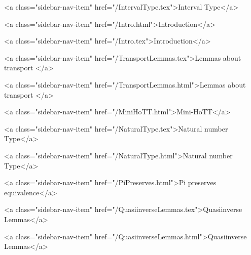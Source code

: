       
        
          <a class="sidebar-nav-item" href="/IntervalType.tex">Interval Type</a>
        
      
    
      
        
          <a class="sidebar-nav-item" href="/Intro.html">Introduction</a>
        
      
    
      
        
          <a class="sidebar-nav-item" href="/Intro.tex">Introduction</a>
        
      
    
      
        
          <a class="sidebar-nav-item" href="/TransportLemmas.tex">Lemmas about transport </a>
        
      
    
      
        
          <a class="sidebar-nav-item" href="/TransportLemmas.html">Lemmas about transport </a>
        
      
    
      
        
          <a class="sidebar-nav-item" href="/MiniHoTT.html">Mini-HoTT</a>
        
      
    
      
        
          <a class="sidebar-nav-item" href="/NaturalType.tex">Natural number Type</a>
        
      
    
      
        
          <a class="sidebar-nav-item" href="/NaturalType.html">Natural number Type</a>
        
      
    
      
        
          <a class="sidebar-nav-item" href="/PiPreserves.html">Pi preserves equivalence</a>
        
      
    
      
        
          <a class="sidebar-nav-item" href="/QuasiinverseLemmas.tex">Quasiinverse Lemmas</a>
        
      
    
      
        
          <a class="sidebar-nav-item" href="/QuasiinverseLemmas.html">Quasiinverse Lemmas</a>
        
